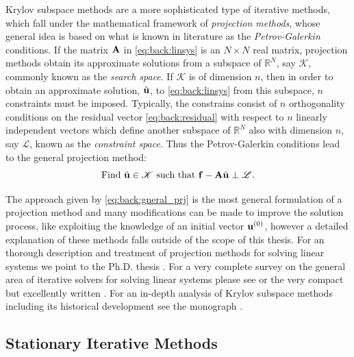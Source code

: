 Krylov subspace methods are a more sophisticated type of iterative methods,
which fall under the mathematical framework of \textit{projection methods},
whose general idea is based on what is known in literature as the
\textit{Petrov-Galerkin} conditions. If the matrix $\mathbf{A}$ in
\eqref{eq:back:linsys} is an $N\times N$ real matrix, projection methods obtain
its approximate solutions from a subspace of $\mathbb{R}^{N}$, say $\mathscr{K}$, commonly known as the \emph{search space}.
If $\mathscr{K}$ is of dimension $n$, then in order to obtain an approximate
solution, $\hat{\mathbf{u}}$, to \eqref{eq:back:linsys} from this subspace, $n$
constraints must be imposed. Typically, the constrains consist of $n$ orthogonality conditions on the residual vector \eqref{eq:back:residual} with respect to $n$ linearly independent vectors which define another subspace of $\mathbb{R}^{N}$ also with dimension $n$, say $\mathscr{L}$, known as the
\textit{constraint space}. Thus the Petrov-Galerkin conditions lead to the general projection method:
\begin{equation}
\text{Find } \hat{\mathbf{u}}\in\mathscr{K}\text{ such that } \mathbf{f}-\mathbf{A}\hat{\mathbf{u}}\perp\mathscr{L}.
\label{eq:back:gneral_prj}
\end{equation}

The approach given by \eqref{eq:back:gneral_prj} is the most general formulation of a projection method and many modifications can be made to improve the solution process, like exploiting the knowledge of an initial vector $\mathbf{u}^{(0)}$, however a detailed explanation of these methods falls outside of the scope of this thesis. For an thorough description and treatment of projection methods for solving linear systems we point to the Ph.D. thesis \cite{Gaul14}. For a very complete survey on the general area of iterative solvers for solving linear systems please see \cite{Saa03} or the very compact but excellently written \cite{Gre97}. For an in-depth analysis of Krylov subspace methods including its historical development see the monograph \cite{LieStr12}.

\subsection{Stationary Iterative Methods}
\label{back:itersolvers:class_sol}


